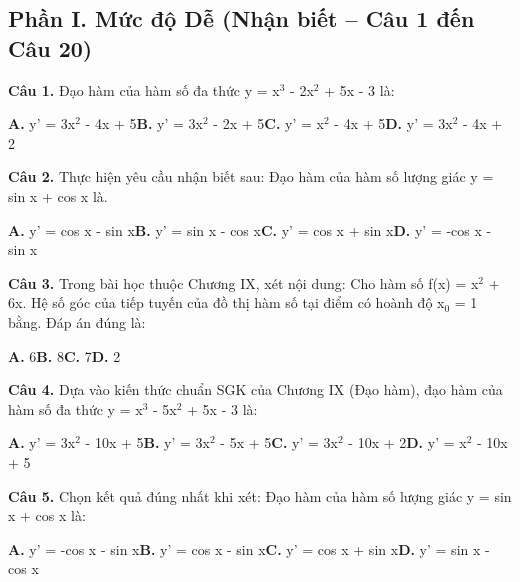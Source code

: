 \documentclass[11pt,a4paper]{article}
\begin{document}
\subsection*{\color{accent} Phần I. Mức độ Dễ (Nhận biết -- Câu 1 đến Câu 20)}
\textbf{\color{primary} Câu 1.} Đạo hàm của hàm số đa thức y = x$^3$ - 2x$^2$ + 5x - 3 là:\par
\hspace*{1.5em}\textbf{A.} y' = 3x$^2$ - 4x + 5\quad\quad \textbf{B.} y' = 3x$^2$ - 2x + 5\quad\quad \textbf{C.} y' = x$^2$ - 4x + 5\quad\quad \textbf{D.} y' = 3x$^2$ - 4x + 2\par\vspace{2pt}
\textbf{\color{primary} Câu 2.} Thực hiện yêu cầu nhận biết sau: Đạo hàm của hàm số lượng giác y = sin x + cos x là.\par
\hspace*{1.5em}\textbf{A.} y' = cos x - sin x\quad\quad \textbf{B.} y' = sin x - cos x\quad\quad \textbf{C.} y' = cos x + sin x\quad\quad \textbf{D.} y' = -cos x - sin x\par\vspace{2pt}
\textbf{\color{primary} Câu 3.} Trong bài học thuộc Chương IX, xét nội dung: Cho hàm số f(x) = x$^2$ + 6x. Hệ số góc của tiếp tuyến của đồ thị hàm số tại điểm có hoành độ x$_0$ = 1 bằng. Đáp án đúng là:\par
\hspace*{1.5em}\textbf{A.} 6\quad\quad \textbf{B.} 8\quad\quad \textbf{C.} 7\quad\quad \textbf{D.} 2\par\vspace{2pt}
\textbf{\color{primary} Câu 4.} Dựa vào kiến thức chuẩn SGK của Chương IX (Đạo hàm), đạo hàm của hàm số đa thức y = x$^3$ - 5x$^2$ + 5x - 3 là:\par
\hspace*{1.5em}\textbf{A.} y' = 3x$^2$ - 10x + 5\quad\quad \textbf{B.} y' = 3x$^2$ - 5x + 5\quad\quad \textbf{C.} y' = 3x$^2$ - 10x + 2\quad\quad \textbf{D.} y' = x$^2$ - 10x + 5\par\vspace{2pt}
\textbf{\color{primary} Câu 5.} Chọn kết quả đúng nhất khi xét: Đạo hàm của hàm số lượng giác y = sin x + cos x là:\par
\hspace*{1.5em}\textbf{A.} y' = -cos x - sin x\quad\quad \textbf{B.} y' = cos x - sin x\quad\quad \textbf{C.} y' = cos x + sin x\quad\quad \textbf{D.} y' = sin x - cos x\par\vspace{2pt}
\end{document}
